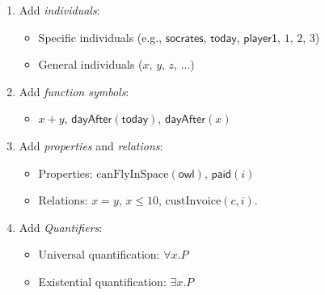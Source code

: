 \documentclass[xetex,aspectratio=169,14pt,hyperref={pdfpagelabels=true,pdflang={en-GB}}]{beamer}
\begin{document}
\begin{frame}[t]

  \begin{enumerate}
  \item Add \emph{individuals}:
    \begin{itemize}
    \item Specific individuals (e.g., $\mathsf{socrates}$, $\mathsf{today}$, $\mathsf{player1}$, $1$, $2$, $3$) \\
    \item General individuals ($x$, $y$, $z$, ...) \\
    \end{itemize}

    \bigskip

  \item Add \emph{function symbols}:
    \begin{itemize}
    \item $x + y$, $\mathsf{dayAfter}(\mathsf{today})$, $\mathsf{dayAfter}(x)$
    \end{itemize}

    \bigskip

  \item Add \emph{properties} and \emph{relations}:
    \begin{itemize}
    \item Properties: $\mathrm{canFlyInSpace}(\mathsf{owl})$, $\mathsf{paid}(i)$
    \item Relations: $x = y$, $x \leq 10$, $\mathrm{custInvoice}(c, i)$.
    \end{itemize}

    \bigskip

  \item Add \emph{Quantifiers}:
    \begin{itemize}
    \item Universal quantification: $\forall x. P$
    \item Existential quantification: $\exists x. P$
    \end{itemize}

  \end{enumerate}
\end{frame}
\end{document}
